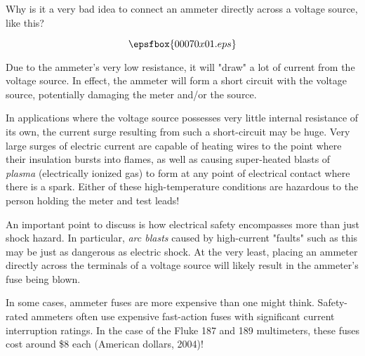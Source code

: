 

Why is it a very bad idea to connect an ammeter directly across a voltage source, like this?

$$\epsfbox{00070x01.eps}$$







Due to the ammeter's very low resistance, it will "draw" a lot of current from the voltage source.  In effect, the ammeter will form a short circuit with the voltage source, potentially damaging the meter and/or the source.

In applications where the voltage source possesses very little internal resistance of its own, the current surge resulting from such a short-circuit may be huge.  Very large surges of electric current are capable of heating wires to the point where their insulation bursts into flames, as well as causing super-heated blasts of {\it plasma} (electrically ionized gas) to form at any point of electrical contact where there is a spark.  Either of these high-temperature conditions are hazardous to the person holding the meter and test leads!







An important point to discuss is how electrical safety encompasses more than just shock hazard.  In particular, {\it arc blasts} caused by high-current "faults" such as this may be just as dangerous as electric shock.  At the very least, placing an ammeter directly across the terminals of a voltage source will likely result in the ammeter's fuse being blown.

In some cases, ammeter fuses are more expensive than one might think.  Safety-rated ammeters often use expensive fast-action fuses with significant current interruption ratings.  In the case of the Fluke 187 and 189 multimeters, these fuses cost around \$8 each (American dollars, 2004)!




